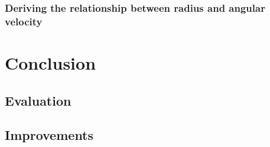 \documentclass[10pt, letterpaper]{article}
\begin{document}
    \subsubsection{Deriving the relationship between radius and angular velocity} \label{sssec:derivation}

  \section{Conclusion}

    \subsection{Evaluation}

    \subsection{Improvements}
\end{document}
